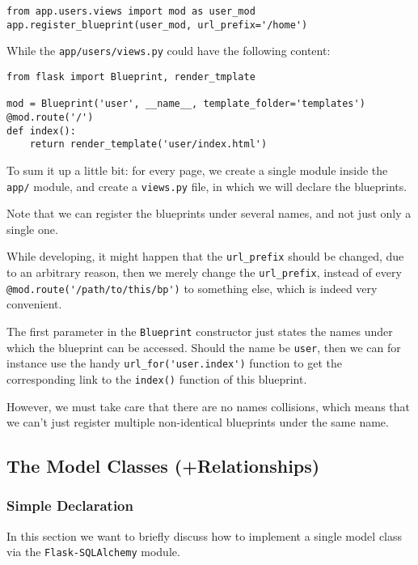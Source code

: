 \documentclass[../main/main.tex]{subfiles}
\begin{document}
\begin{lstlisting}
from app.users.views import mod as user_mod
app.register_blueprint(user_mod, url_prefix='/home')
\end{lstlisting}

While the \lstinline|app/users/views.py| could have the following
content:

\begin{lstlisting}
from flask import Blueprint, render_tmplate

mod = Blueprint('user', __name__, template_folder='templates')
@mod.route('/')
def index():
    return render_template('user/index.html')
\end{lstlisting}

To sum it up a little bit: for every page, we create a single module
inside the \lstinline|app/| module, and create a \lstinline|views.py|
file, in which we will declare the blueprints. 

Note that we can register the blueprints under several names, and not
just only a single one. 

While developing, it might happen that the \lstinline|url_prefix|
should be changed, due to an arbitrary reason, then we merely change
the \lstinline|url_prefix|, instead of every
\lstinline|@mod.route('/path/to/this/bp')| to something else, which is
indeed very convenient.

The first parameter in the \lstinline|Blueprint| constructor just
states the names under which the blueprint can be accessed. Should the
name be \lstinline|user|, then we can for instance use the handy
\lstinline|url_for('user.index')| function to get the corresponding
link to the \lstinline|index()| function of this blueprint. 

However, we must take care that there are no names collisions, which
means that we can't just register multiple non-identical blueprints
under the same name. 


\subsection{The Model Classes (+Relationships)}

\subsubsection{Simple Declaration}
In this section we want to briefly discuss how to implement a single
model class via the \lstinline|Flask-SQLAlchemy| module. 
\end{document}
